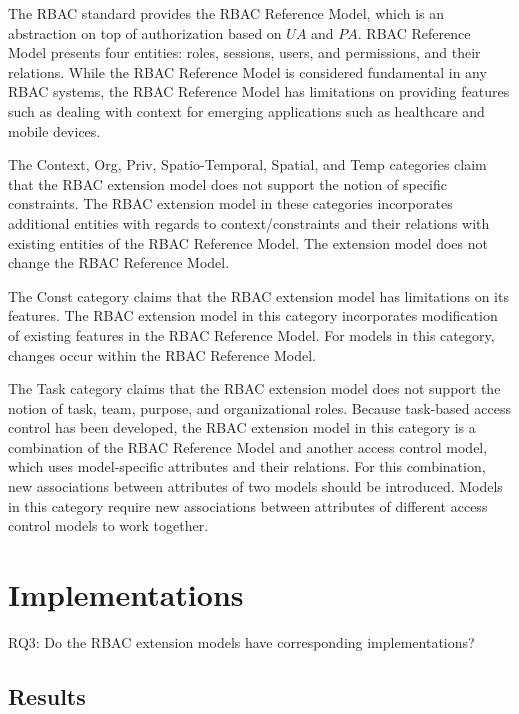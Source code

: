 The RBAC standard provides the RBAC Reference Model, which is an abstraction on top of authorization based on $UA$ and $PA$. RBAC Reference Model presents four entities: roles, sessions, users, and permissions, and their relations. While the RBAC Reference Model is considered fundamental in any RBAC systems, the RBAC Reference Model has limitations on providing features such as dealing with context for emerging applications such as healthcare and mobile devices. 

The Context, Org, Priv, Spatio-Temporal, Spatial, and Temp categories claim that the RBAC extension model does not support the notion of specific constraints. The RBAC extension model in these categories incorporates additional entities with regards to context/constraints and their relations with existing entities of the RBAC Reference Model. The extension model does not change the RBAC Reference Model.

The Const category claims that the RBAC extension model has limitations on its features. The RBAC extension model in this category incorporates modification of existing features in the RBAC Reference Model. For models in this category, changes occur within the RBAC Reference Model.

The Task category claims that the RBAC extension model does not support the notion of task, team, purpose, and organizational roles. Because task-based access control has been developed, the RBAC extension model in this category is a combination of the RBAC Reference Model and another access control model, which uses model-specific attributes and their relations. For this combination, new associations between attributes of two models should be introduced. Models in this category require new associations between attributes of different access control models to work together.


\section{Implementations} \label{sec:implementations}

RQ3: Do the RBAC extension models have corresponding implementations?

\subsection{Results}

